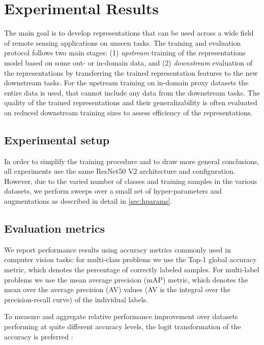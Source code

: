 \section{Experimental Results}




The main goal is to develop representations that can be used across a wide field of remote sensing applications on unseen tasks. The training and evaluation protocol follows two main stages: (1) \emph{upstream} training of the representations model based on some out- or in-domain data, and (2) \emph{downstream} evaluation of the representations by transferring the trained representation features to the new downstream tasks. For the upstream training on in-domain proxy datasets the entire data is used, that cannot include any data from the downstream tasks. The quality of the trained representations and their generalizability is often evaluated on reduced downstream training sizes to assess efficiency of the representations.

\subsection{Experimental setup}
In order to simplify the training procedure and to draw more general conclusions, all experiments use the same ResNet50 V2 architecture \citep{he2016:identity} and configuration. However, due to the varied number of classes and training samples in the various datasets, we perform sweeps over a small set of hyper-parameters and augmentations
as described in detail in \cref{sec:hparams}.




\subsection{Evaluation metrics}
We report performance results using accuracy metrics commonly used in computer vision tasks: for multi-class problems we use the Top-1 global accuracy metric, which denotes the percentage of correctly labeled samples.
For multi-label problems we use the mean average precision (mAP) metric, which denotes the mean over the average precision (AV) values (AV is the integral over the precision-recall curve) of the individual labels. 

To measure and aggregate relative performance improvement over datasets performing at quite different accuracy levels, the logit transformation of the accuracy is preferred \citep{kornblith2019:imagenet}:

